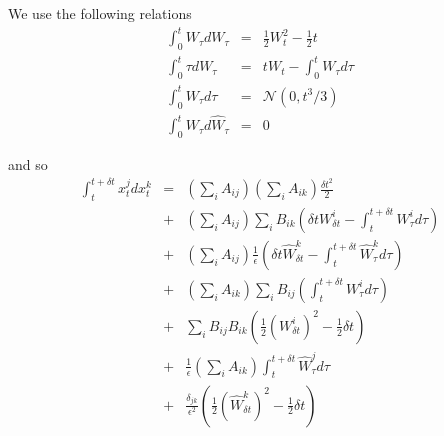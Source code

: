\documentclass[12pt]{article}
\begin{document}
We use the following relations
\begin{eqnarray}
\int_0^t W_\tau dW_\tau	&=& \frac{1}{2} W_t^2 - \frac{1}{2} t \\
\int_0^t \tau dW_\tau &=& t W_t - \int_0^t W_\tau d \tau \\
\int_0^t W_\tau d\tau &=& \mathcal{N} (0, t^3/3) \\
\int_0^t W_\tau d \hat{W}_\tau &=& 0
\end{eqnarray}

and so
\begin{eqnarray}
\int_t^{t + \delta t} x_t^j dx_t^k &=& \left( \sum_i A_{ij} \right) \left( \sum_i A_{ik} \right) \frac{\delta t^2}{2} \\
&+& \left( \sum_i A_{ij} \right) \sum_i B_{ik} \left(\delta t W_{\delta t}^i -\int_t^{t + \delta t} W_\tau^i d\tau \right) \\
&+& \left( \sum_i A_{ij} \right) \frac{1}{\epsilon} \left(\delta t \hat{W}_{\delta t}^k -\int_t^{t + \delta t} \hat{W}_\tau^k d\tau \right) \\
&+& \left( \sum_i A_{ik} \right) \sum_i B_{ij} \left( \int_t^{t + \delta t} W_\tau^i d\tau \right) \\ 
&+& \sum_i B_{ij} B_{ik} \left( \frac{1}{2} \left(W_{\delta t}^i\right)^2 - \frac{1}{2} \delta t \right)  \\
&+& \frac{1}{\epsilon} \left(\sum_i A_{ik} \right) \int_t^{t + \delta t} \hat{W}_\tau^j d\tau \\
&+& \frac{\delta_{jk}}{\epsilon^2} \left( \frac{1}{2} (\hat{W}_{\delta t}^k)^2 - \frac{1}{2} \delta t \right)
\end{eqnarray}
\end{document}
